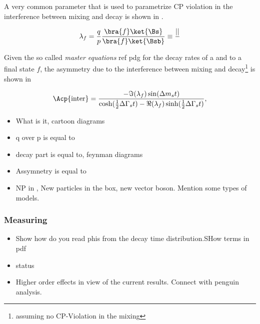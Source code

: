 \noindent A very common parameter that is used to parametrize CP violation in the interference between mixing and decay is shown in .

\begin{equation}
 \lambda_{f} = \frac{q}{p} \frac{\bra{f}\ket{\Bs}} {\bra{f}\ket{\Bsb}} \equiv \frac{||}{}
\label{lambda_cpv}
\end{equation}

Given the so called {\it master equations}{\color{red} ref pdg} for the decay rates of a \Bs and \Bsb
to a final state $f$, the asymmetry due to the interference between mixing and decay\footnote{assuming no CP-Violation
in the \BBbarSyst mixing} is shown in 

\newcommand{\half}{\frac{1}{2}}
\begin{equation}
  \Acp{\text{inter}} = \frac{ - \Im(\lambda_f) \sin(\Delta m_s t)} {\cosh(\half \Delta\Gamma_s t) - \Re(\lambda_f)\sinh(\half\Delta\Gamma_s t)},
\label{cpv_interf}
\end{equation}


\begin{itemize}
  \item What is it, cartoon diagrams
  \item q over p is equal to
  \item decay part is equal to, feynman diagrams
  \item Assymnetry is equal to
  \item NP in \phis, New particles in the box, new vector boson. Mention some types of models.
\end{itemize}

\subsubsection{Measuring \phis}

\begin{itemize}
  \item Show how do you read phis from the decay time distribution.SHow terms in pdf
  \item \phis status
  \item Higher order effects in view of the current results. Connect with penguin analysis.
\end{itemize}
